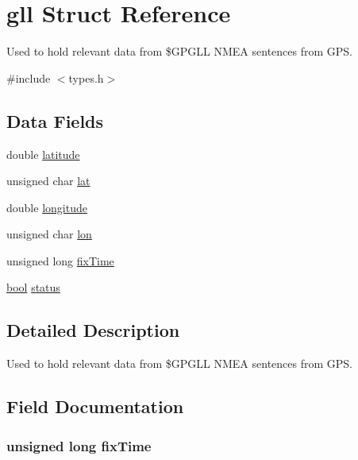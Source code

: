 \hypertarget{structgll}{}\section{gll Struct Reference}
\label{structgll}


Used to hold relevant data from \$\+G\+P\+G\+LL N\+M\+EA sentences from G\+PS.  




{\ttfamily \#include $<$types.\+h$>$}

\subsection*{Data Fields}
\begin{DoxyCompactItemize}
\item 
double \hyperlink{structgll_a76714bdbc5c536fa77dfb14533ff82a9}{latitude}
\item 
unsigned char \hyperlink{structgll_a6a2e4ad53afd61fcd716002fc2965220}{lat}
\item 
double \hyperlink{structgll_ac155e35fdeebafc89723a51520fb9fe6}{longitude}
\item 
unsigned char \hyperlink{structgll_a7e55b80071251dcef4239e60122980a4}{lon}
\item 
unsigned long \hyperlink{structgll_ac80d42f9b62a236bcb13ea2320515359}{fix\+Time}
\item 
\hyperlink{types_8h_af6a258d8f3ee5206d682d799316314b1}{bool} \hyperlink{structgll_ad1f0bff7112206922c9d5a87adad6f2b}{status}
\end{DoxyCompactItemize}


\subsection{Detailed Description}
Used to hold relevant data from \$\+G\+P\+G\+LL N\+M\+EA sentences from G\+PS. 

\subsection{Field Documentation}
\subsubsection[{\texorpdfstring{fix\+Time}{fixTime}}]{\setlength{\rightskip}{0pt plus 5cm}unsigned long fix\+Time}\hypertarget{structgll_ac80d42f9b62a236bcb13ea2320515359}{}\label{structgll_ac80d42f9b62a236bcb13ea2320515359}
